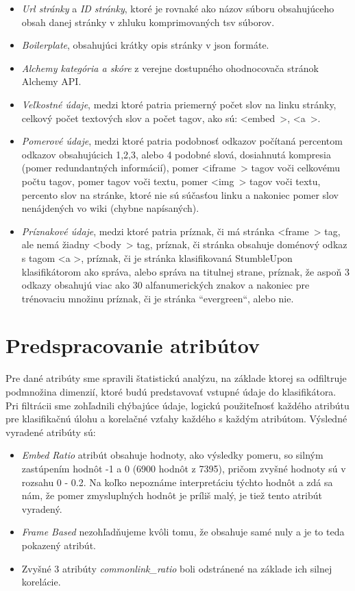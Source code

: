 \documentclass{iitsrc}
\begin{document}
\begin{multicols}{2}
\begin{itemize}
	\item \emph{Url stránky} a \emph{ID stránky}, ktoré je rovnaké ako názov súboru obsahujúceho obsah danej stránky v zhluku komprimovaných tsv súborov.
	\item \emph{Boilerplate}, obsahujúci krátky opis stránky v json formáte.
	\item \emph{Alchemy kategória a skóre} z verejne dostupného ohodnocovača stránok Alchemy API.
	\item \emph{Veľkostné údaje}, medzi ktoré patria priemerný počet slov na linku stránky, celkový počet textových slov a počet tagov, ako sú: \mbox{\textless embed \textgreater}, \mbox{\textless a \textgreater}.
	\item \emph{Pomerové údaje}, medzi ktoré patria podobnosť odkazov počítaná percentom odkazov obsahujúcich 1,2,3, alebo 4 podobné slová, dosiahnutá kompresia (pomer redundantných informácií), pomer \mbox{\textless iframe \textgreater} tagov voči celkovému počtu tagov, pomer tagov voči textu, pomer \mbox{\textless img \textgreater} tagov voči textu, percento slov na stránke, ktoré nie sú súčasťou linku a nakoniec pomer slov nenájdených vo wiki (chybne napísaných).
	\item \emph{Príznakové údaje}, medzi ktoré patria príznak, či má stránka \mbox{\textless frame \textgreater} tag, ale nemá žiadny \mbox{\textless body \textgreater} tag, príznak, či stránka obsahuje doménový odkaz s tagom \textless a \textgreater, príznak, či je stránka klasifikovaná StumbleUpon klasifikátorom ako správa, alebo správa na titulnej strane, príznak, že aspoň 3 odkazy obsahujú viac ako 30 alfanumerických znakov a nakoniec pre trénovaciu množinu príznak, či je stránka ``evergreen``, alebo nie.
\end{itemize}

\section{Predspracovanie atribútov}
Pre dané atribúty sme spravili štatistickú analýzu, na základe ktorej sa odfiltruje podmnožina dimenzií, ktoré budú predstavovať vstupné údaje do klasifikátora. Pri filtrácii sme zohľadnili chýbajúce údaje, logickú použiteľnosť každého atribútu pre klasifikačnú úlohu a korelačné vzťahy každého s každým atribútom. Výsledné vyradené atribúty sú:

\begin{itemize}
	\item \emph{Embed Ratio} atribút obsahuje hodnoty, ako výsledky pomeru, so silným zastúpením hodnôt -1 a 0 (6900 hodnôt z 7395), pričom zvyšné hodnoty sú v rozsahu 0 - 0.2. Na koľko nepoznáme interpretáciu týchto hodnôt a zdá sa nám, že pomer zmysluplných hodnôt je príliš malý, je tiež tento atribút vyradený.
	\item \emph{Frame Based} nezohľadňujeme kvôli tomu, že obsahuje samé nuly a je to teda pokazený atribút.
	\item Zvyšné 3 atribúty \emph{commonlink\_ratio} boli odstránené na základe ich silnej korelácie.
\end{itemize}


\end{multicols}
\end{document}
